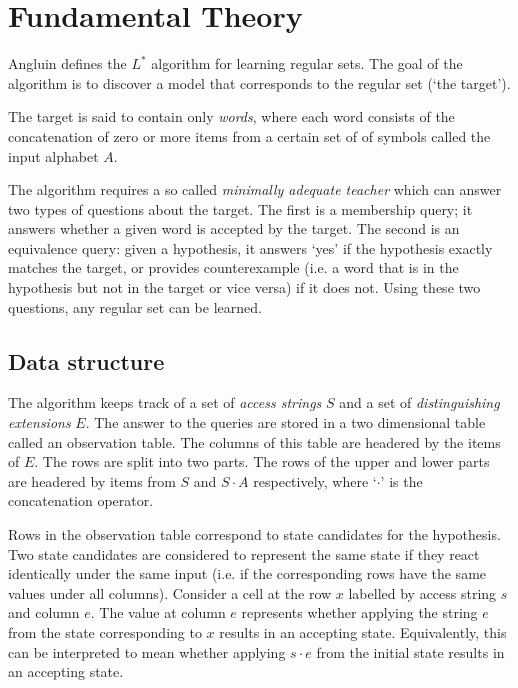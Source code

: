 \documentclass[multi,crop=false,class=article]{standalone}
\newcommand{\concat}{\cdot}
\begin{document}
\section{Fundamental Theory}
\label{sec:fundamental-theory}

Angluin defines the $L^*$ algorithm for learning regular sets\cite{Angluin87}.
The goal of the algorithm is to discover a model that corresponds to the regular
set (`the target').

The target is said to contain only \textit{words}, where each word consists
of the concatenation of zero or more items from a certain set of of symbols
called the input alphabet $A$.

The algorithm requires a so called \textit{minimally adequate teacher} which can
answer two types of questions about the target. The first is a membership query;
it answers whether a given word is accepted by the target. The second is an
equivalence query: given a hypothesis, it answers `yes' if the hypothesis
exactly matches the target, or provides counterexample (i.e. a word that is in
the hypothesis but not in the target or vice versa) if it does not. Using these
two questions, any regular set can be learned.

\subsection {Data structure}

The algorithm keeps track of a set of \textit{access strings} $S$ and a set of
\textit{distinguishing extensions} $E$. The answer to the queries are stored in
a two dimensional table called an observation table. The columns of this table
are headered by the items of $E$. The rows are split into two parts. The rows of
the upper and lower parts are headered by items from $S$ and $S \concat A$
respectively, where `$\concat$' is the concatenation operator. 

Rows in the observation table correspond to state candidates for the hypothesis.
Two state candidates are considered to represent the same state if they react
identically under the same input (i.e. if the corresponding rows have the same
values under all columns). Consider a cell at the row $x$ labelled by access
string $s$ and column $e$. The value at column $e$ represents whether applying
the string $e$ from the state corresponding to $x$ results in an accepting
state. Equivalently, this can be interpreted to mean whether applying $s \concat
e$ from the initial state results in an accepting state.
\end{document}
